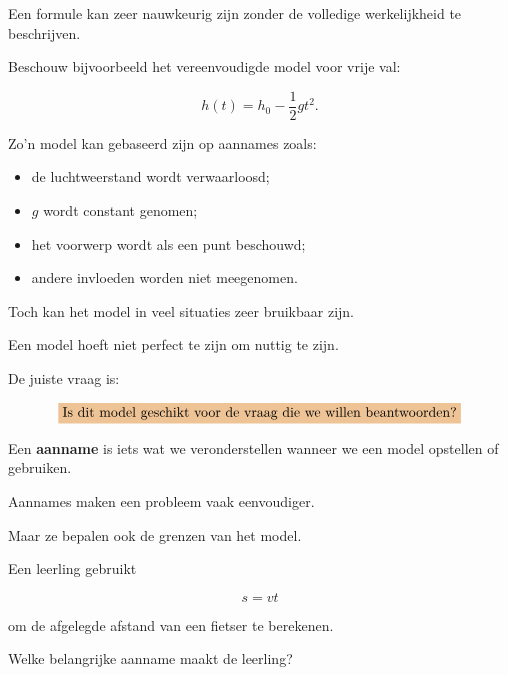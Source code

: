 \documentclass{ximera}
\begin{document}


Een formule kan zeer nauwkeurig zijn zonder de volledige werkelijkheid
te beschrijven.

Beschouw bijvoorbeeld het vereenvoudigde model voor vrije val:

\[
h(t)=h_0-\frac12gt^2.
\]

Zo'n model kan gebaseerd zijn op aannames zoals:

\begin{itemize}
  \item de luchtweerstand wordt verwaarloosd;
  \item $g$ wordt constant genomen;
  \item het voorwerp wordt als een punt beschouwd;
  \item andere invloeden worden niet meegenomen.
\end{itemize}

Toch kan het model in veel situaties zeer bruikbaar zijn.

\begin{opmerking}
Een model hoeft niet perfect te zijn om nuttig te zijn.

De juiste vraag is:

\[
\important{
\text{Is dit model geschikt voor de vraag die we willen beantwoorden?}
}
\]
\end{opmerking}




Een \textbf{aanname} is iets wat we veronderstellen wanneer we een
model opstellen of gebruiken.

Aannames maken een probleem vaak eenvoudiger.

Maar ze bepalen ook de grenzen van het model.

\begin{oefening}{\oefU}

Een leerling gebruikt

\[
s=vt
\]

om de afgelegde afstand van een fietser te berekenen.

Welke belangrijke aanname maakt de leerling?

\begin{multipleChoice}
\end{multipleChoice}

\end{oefening}
\end{document}
